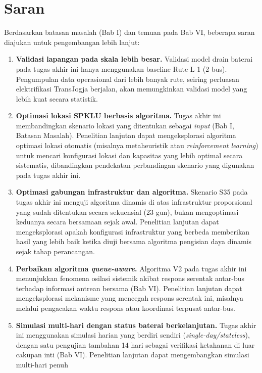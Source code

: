 \section{Saran}

Berdasarkan batasan masalah (Bab I) dan temuan pada Bab VI, beberapa
saran diajukan untuk pengembangan lebih lanjut:

\begin{enumerate}
	\item \textbf{Validasi lapangan pada skala lebih besar.} Validasi model
	drain baterai pada tugas akhir ini hanya menggunakan baseline Rute L-1
	(2 bus). Pengumpulan data operasional dari lebih banyak rute, seiring
	perluasan elektrifikasi TransJogja berjalan, akan memungkinkan
	validasi model yang lebih kuat secara statistik.
	\item \textbf{Optimasi lokasi SPKLU berbasis algoritma.} Tugas akhir ini
	membandingkan skenario lokasi yang ditentukan sebagai \textit{input}
	(Bab I, Batasan Masalah). Penelitian lanjutan dapat mengeksplorasi
	algoritma optimasi lokasi otomatis (misalnya metaheuristik atau
	\textit{reinforcement learning}) untuk mencari konfigurasi lokasi dan
	kapasitas yang lebih optimal secara sistematis, dibandingkan
	pendekatan perbandingan skenario yang digunakan pada tugas akhir ini.
	\item \textbf{Optimasi gabungan infrastruktur dan algoritma.} Skenario
	S35 pada tugas akhir ini menguji algoritma dinamis di atas
	infrastruktur proporsional yang sudah ditentukan secara sekuensial (23 gun), bukan
	mengoptimasi keduanya secara bersamaan sejak awal. Penelitian lanjutan
	dapat mengeksplorasi apakah konfigurasi infrastruktur yang berbeda
	memberikan hasil yang lebih baik ketika diuji bersama
	algoritma pengisian daya dinamis sejak tahap perancangan.
	\item \textbf{Perbaikan algoritma \textit{queue-aware}.} Algoritma V2
	pada tugas akhir ini menunjukkan fenomena osilasi sistemik akibat
	respons serentak antar-bus terhadap informasi antrean bersama (Bab
	VI). Penelitian lanjutan dapat mengeksplorasi mekanisme yang mencegah
	respons serentak ini, misalnya melalui pengacakan waktu respons atau
	koordinasi terpusat antar-bus.
	\item \textbf{Simulasi multi-hari dengan status baterai berkelanjutan.}
	Tugas akhir ini menggunakan simulasi harian yang berdiri sendiri
	(\textit{single-day/stateless}), dengan satu pengujian tambahan 14
	hari sebagai verifikasi ketahanan di luar cakupan inti (Bab VI).
	Penelitian lanjutan dapat mengembangkan simulasi multi-hari penuh

\end{enumerate}
